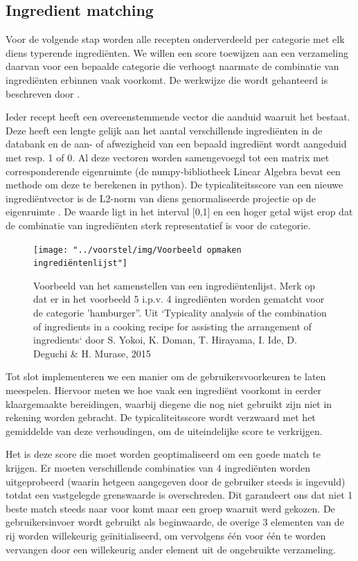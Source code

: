 \documentclass{hogent-article}
\begin{document}
\subsection{Ingredient matching}%

Voor de volgende stap worden alle recepten onderverdeeld per categorie met elk diens typerende ingrediënten. We willen een score toewijzen aan een verzameling daarvan voor een bepaalde categorie die verhoogt naarmate de combinatie van ingrediënten erbinnen vaak voorkomt. De werkwijze die wordt gehanteerd is beschreven door \textcite{Yokoi2015}.

Ieder recept heeft een overeenstemmende vector die aanduid waaruit het bestaat. Deze heeft een lengte gelijk aan het aantal verschillende ingrediënten in de databank en de aan- of afwezigheid van een bepaald ingrediënt wordt aangeduid met resp. 1 of 0. Al deze vectoren worden samengevoegd tot een matrix met  corresponderende eigenruimte (de numpy-bibliotheek Linear Algebra bevat een methode om deze te berekenen in python). De typicaliteitsscore van een nieuwe ingrediëntvector  \autocite{Yokoi2015} is de L2-norm van diens genormaliseerde projectie op de eigenruimte \autocite{Karabiber2024a}. De waarde ligt in het interval [0,1] en een hoger getal wijst erop dat de combinatie van ingrediënten sterk representatief is voor de categorie.

\begin{figure}
    \centering
    \texttt{[image: "../voorstel/img/Voorbeeld opmaken ingrediëntenlijst"]}
    \caption[Voorbeeld van het samenstellen van een ingrediëntenlijst]{Voorbeeld van het samenstellen van een ingrediëntenlijst. Merk op dat er in het voorbeeld 5 i.p.v. 4 ingrediënten worden gematcht voor de categorie 'hamburger''. Uit `Typicality analysis of the combination of ingredients in a cooking recipe for assisting the arrangement of ingredients` door S. Yokoi, K. Doman, T. Hirayama, I. Ide, D. Deguchi \& H. Murase, 2015}
    \label{fig:voorbeeld-opmaken-ingredientenlijst}
\end{figure}

Tot slot implementeren we een manier om de gebruikersvoorkeuren te laten meespelen. Hiervoor meten we hoe vaak een ingrediënt voorkomt in eerder klaargemaakte bereidingen, waarbij diegene die nog niet gebruikt zijn niet in rekening worden gebracht. De typicaliteitsscore wordt verzwaard met het gemiddelde van deze verhoudingen, om de uiteindelijke score te verkrijgen.

Het is deze score die moet worden geoptimaliseerd om een goede match te krijgen. Er moeten verschillende combinaties van 4 ingrediënten worden uitgeprobeerd (waarin hetgeen aangegeven door de gebruiker steeds is ingevuld) totdat een vastgelegde grenswaarde is overschreden. Dit garandeert ons dat niet 1 beste match steeds naar voor komt maar een groep waaruit werd gekozen. De gebruikersinvoer wordt gebruikt als beginwaarde, de overige 3 elementen van de rij worden willekeurig geïnitialiseerd, om vervolgens één voor één te worden vervangen door een willekeurig ander element uit de ongebruikte verzameling. 
\end{document}
